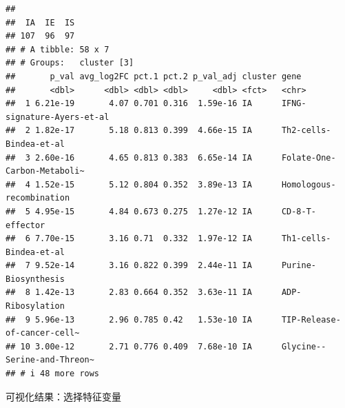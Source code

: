 \documentclass[
  12pt,
]{book}
\newenvironment{Shaded}{\begin{snugshade}}{\end{snugshade}}
\newcommand{\AttributeTok}[1]{\textcolor[rgb]{0.13,0.29,0.53}{#1}}
\newcommand{\DecValTok}[1]{\textcolor[rgb]{0.00,0.00,0.81}{#1}}
\newcommand{\FunctionTok}[1]{\textcolor[rgb]{0.13,0.29,0.53}{\textbf{#1}}}
\newcommand{\NormalTok}[1]{#1}
\newcommand{\OtherTok}[1]{\textcolor[rgb]{0.56,0.35,0.01}{#1}}
\newcommand{\SpecialCharTok}[1]{\textcolor[rgb]{0.81,0.36,0.00}{\textbf{#1}}}
\newcommand{\StringTok}[1]{\textcolor[rgb]{0.31,0.60,0.02}{#1}}
\begin{document}
\begin{verbatim}
## 
##  IA  IE  IS 
## 107  96  97 
## # A tibble: 58 x 7
## # Groups:   cluster [3]
##       p_val avg_log2FC pct.1 pct.2 p_val_adj cluster gene                       
##       <dbl>      <dbl> <dbl> <dbl>     <dbl> <fct>   <chr>                      
##  1 6.21e-19       4.07 0.701 0.316  1.59e-16 IA      IFNG-signature-Ayers-et-al 
##  2 1.82e-17       5.18 0.813 0.399  4.66e-15 IA      Th2-cells-Bindea-et-al     
##  3 2.60e-16       4.65 0.813 0.383  6.65e-14 IA      Folate-One-Carbon-Metaboli~
##  4 1.52e-15       5.12 0.804 0.352  3.89e-13 IA      Homologous-recombination   
##  5 4.95e-15       4.84 0.673 0.275  1.27e-12 IA      CD-8-T-effector            
##  6 7.70e-15       3.16 0.71  0.332  1.97e-12 IA      Th1-cells-Bindea-et-al     
##  7 9.52e-14       3.16 0.822 0.399  2.44e-11 IA      Purine-Biosynthesis        
##  8 1.42e-13       2.83 0.664 0.352  3.63e-11 IA      ADP-Ribosylation           
##  9 5.96e-13       2.96 0.785 0.42   1.53e-10 IA      TIP-Release-of-cancer-cell~
## 10 3.00e-12       2.71 0.776 0.409  7.68e-10 IA      Glycine--Serine-and-Threon~
## # i 48 more rows
\end{verbatim}

\begin{Shaded}
\end{Shaded}

可视化结果：选择特征变量
\end{document}

